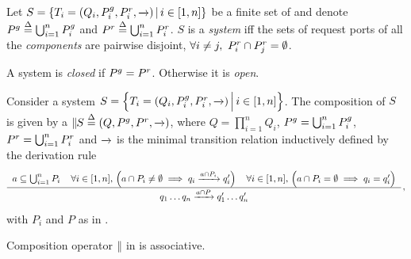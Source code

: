 \begin{definition}[System]
  \label{defn:system}
  Let $S = \setdef{T_i = (Q_i, \pin_i, \pout_i, \goesto{})}{i \in [1,n]}$
  be a finite set of \compmodel{} and denote $\pin \bydef{=}
  \bigcup_{i=1}^n \pin_i$ and $\pout \bydef{=} \bigcup_{i=1}^n \pout_i$.
  $S$ is a \emph{system} iff the sets of request ports of all the
  \emph{components} are pairwise disjoint, \ie $\forall i \neq j,\ \pout_i
  \cap \pout_j = \emptyset$.

  A system is \emph{closed} if $\pin = \pout$.  Otherwise it is
  \emph{open}.  
\end{definition}


\begin{definition}
  \label{defn:composition}
  Consider a system $S = \Setdef{T_i = (Q_i, \pin_i, \pout_i, \goesto{})}{i
    \in [1,n]}$.  The composition of $S$ is given by a \compmodel{}
  $\compose[S] \bydef{=} (Q, \pin, \pout, \goesto{})$, where $Q =
  \prod_{i=1}^n Q_i$, $\pin = \bigcup_{i=1}^n \pin_i$, $\pout =
  \bigcup_{i=1}^n \pout_i$
  and $\goesto{}$ is the minimal transition relation inductively defined by
  the derivation rule
  \begin{equation}
    \label{eq:composition:transitions}
    \renewcommand{\arraystretch}{1.5}
    \derrule[3]{
      a \subseteq \bigcup_{i=1}^n P_i &
      \forall i \in [1,n],\, \Big(a \cap P_i \neq \emptyset \implies 
        q_i \goesto{a \cap P_i} q_i'\Big) &
      \forall i \in [1,n],\, \Big(a \cap P_i = \emptyset \implies 
        q_i = q_i'\Big) 
    }{
      q_1 \dots q_n \goesto{a \cap P} q_1' \dots q_n'
    }\,,
  \end{equation}
  with $P_i$ and $P$ as in .
\end{definition}

\begin{proposition}
  \label{prop:associativity}
  Composition operator $\compose[]$ in  is associative.
\end{proposition}

